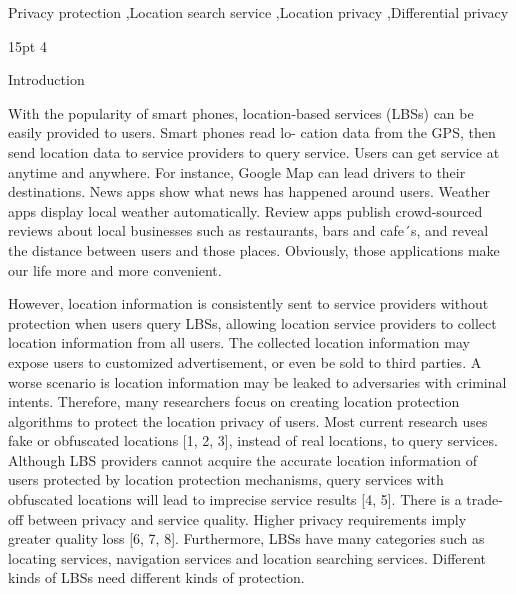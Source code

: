 \documentclass[a4paper,fleqn]{cas-dc}
\begin{document}
\begin{keywords}
Privacy protection \sep Location search service \sep Location privacy \sep Differential privacy
\end{keywords}

\maketitle
\makeatletter
\renewcommand\section{\@startsection{section}{1}{\z@}%
    {15pt \@plus 3\p@ \@minus 3\p@}%
    {4\p@}%
    {%
     \sectionfont\raggedright\hst[13pt]}}
\renewcommand\subsection{\@startsection{subsection}{2}{\z@}%
    {10pt \@plus 3\p@ \@minus 2\p@}%
    {.1\p@}%
    {%
     \ssectionfont\raggedright }}
\section{Introduction}

With the popularity of smart phones, location-based services (LBSs) can be easily provided to users. Smart phones read lo- cation data from the GPS, then send location data to service providers to query service. Users can get service at anytime and anywhere. For instance, Google Map can lead drivers to their destinations. News apps show what news has happened around users. Weather apps display local weather automatically. Review apps publish crowd-sourced reviews about local businesses such as restaurants,  bars and cafe´s,  and reveal the distance between users and those places. Obviously, those applications make our life more and more convenient. 

However, location information is consistently sent to service providers without protection when users query LBSs, allowing location service providers to collect location information from all users. The collected location information may expose users to customized advertisement, or even be sold to third parties. A worse scenario is location information may be leaked to adversaries with criminal intents. Therefore, many researchers focus on creating location protection algorithms to protect the location privacy of users. Most current research uses fake or obfuscated locations [1, 2, 3], instead of real locations, to query services. Although LBS providers cannot acquire the accurate location information of users protected by location protection mechanisms, query services with obfuscated locations will lead to imprecise service results [4, 5]. There is a trade-off between privacy and service quality. Higher privacy requirements imply greater quality loss [6, 7, 8]. Furthermore, LBSs have many categories such as locating services, navigation services and location searching services. Different kinds of LBSs need different kinds of protection.\\
\end{document}
